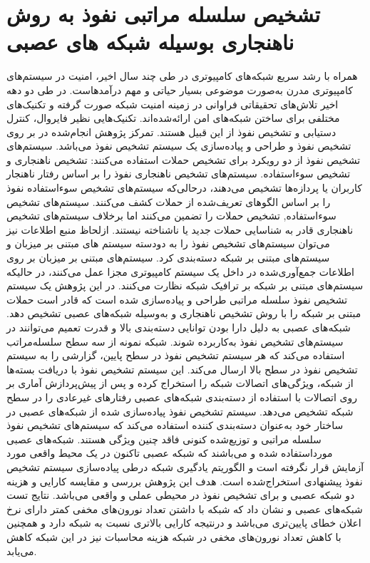 \documentclass[a4paper,oneside,12pt]{report}
\begin{document}
\section{تشخیص سلسله مراتبی نفوذ به روش ناهنجاری بوسیله شبکه های عصبی}
همراه با رشد سریع شبکه‌های کامپیوتری در طی چند سال اخیر، امنیت در سیستم‌های کامپیوتری مدرن به‌صورت موضوعی بسیار حیاتی و مهم درآمدهاست. در طی دو دهه اخیر تلاش‌های تحقیقاتی فراوانی در زمینه امنیت شبکه صورت گرفته و تکنیک‌های مختلفی برای ساختن شبکه‌های امن ارائه‌شده‌اند. تکنیک‌هایی نظیر فایروال، کنترل دستیابی و تشخیص نفوذ از این قبیل هستند. تمرکز پژوهش انجام‌شده در
\cite{27} 
بر روی تشخیص نفوذ و طراحی و پیاده‌سازی یک سیستم تشخیص نفوذ می‌باشد. سیستم‌های تشخیص نفوذ از دو رویکرد برای تشخیص حملات استفاده می‌کنند: تشخیص ناهنجاری و تشخیص سوءاستفاده. سیستم‌های تشخیص ناهنجاری نفوذ را بر اساس رفتار ناهنجار کاربران یا پردازه‌ها تشخیص می‌دهند، درحالی‌که سیستم‌های تشخیص سوءاستفاده نفوذ را بر اساس الگوهای تعریف‌شده از حملات کشف می‌کنند. سیستم‌های تشخیص سوءاستفاده, تشخیص حملات را تضمین می‌کنند اما برخلاف سیستم‌های تشخیص ناهنجاری قادر به شناسایی حملات جدید یا ناشناخته نیستند. ازلحاظ منبع اطلاعات نیز می‌توان سیستم‌های تشخیص نفوذ را به دودسته سیستم های مبتنی بر میزبان و سیستم‌های مبتنی بر شبکه دسته‌بندی کرد. سیستم‌های مبتنی بر میزبان بر روی اطلاعات جمع‌آوری‌شده در داخل یک سیستم کامپیوتری مجزا عمل می‌کنند، در حالیکه سیستم‌های مبتنی بر شبکه بر ترافیک شبکه نظارت می‌کنند. در این پژوهش یک سیستم تشخیص نفوذ سلسله مراتبی طراحی و پیاده‌سازی شده است که قادر است حملات مبتنی بر شبکه را با روش تشخیص ناهنجاری و به‌وسیله شبکه‌های عصبی تشخیص دهد. شبکه‌های عصبی به دلیل دارا بودن توانایی دسته‌بندی بالا و قدرت تعمیم می‌توانند در سیستم‌های تشخیص نفوذ به‌کاربرده شوند. شبکه نمونه از سه سطح سلسله‌مراتب استفاده می‌کند که هر سیستم تشخیص نفوذ در سطح پایین، گزارشی را به سیستم تشخیص نفوذ در سطح بالا ارسال می‌کند. این سیستم تشخیص نفوذ با دریافت بسته‌ها از شبکه، ویژگی‌های اتصالات شبکه را استخراج کرده و پس از پیش‌پردازش آماری بر روی اتصالات با استفاده از دسته‌بندی شبکه‌های عصبی رفتارهای غیرعادی را در سطح شبکه تشخیص می‌دهد. سیستم تشخیص نفوذ پیاده‌سازی شده از شبکه‌های عصبی در ساختار خود به‌عنوان دسته‌بندی کننده استفاده می‌کند که سیستم‌های تشخیص نفوذ سلسله مراتبی و توزیع‌شده کنونی فاقد چنین ویژگی هستند. شبکه‌های عصبی مورداستفاده شده 
و 
می‌باشند که شبکه عصبی 
تاکنون در یک محیط واقعی مورد آزمایش قرار نگرفته است و الگوریتم یادگیری شبکه 
درطی پیاده‌سازی سیستم تشخیص نفوذ پیشنهادی استخراج‌شده است. هدف این پژوهش 
\cite{27}
بررسی و مقایسه کارایی و هزینه دو شبکه عصبی 
و 
برای تشخیص نفوذ در محیطی عملی و واقعی می‌باشد. نتایج تست شبکه‌های عصبی 
و 
نشان داد که شبکه 
با داشتن تعداد نورون‌های مخفی کمتر دارای نرخ اعلان خطای پایین‌تری می‌باشد و درنتیجه کارایی بالاتری نسبت به شبکه 
دارد و همچنین با کاهش تعداد نورون‌های مخفی در شبکه 
هزینه محاسبات نیز در این شبکه کاهش می‌یابد. 
\end{document}
